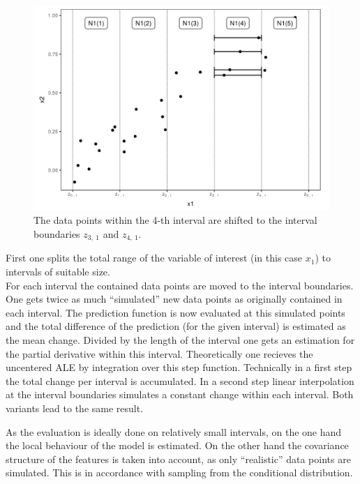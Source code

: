 \documentclass[
]{krantz}
\begin{document}
\begin{figure}
\includegraphics[width=1\linewidth]{images/ale_estimation_intuition} \caption{The data points within the 4-th interval are shifted to the interval boundaries \(z_{3,~1}\) and \(z_{4,~1}\).}\label{fig:dataALE}
\end{figure}



First one splits the total range of the variable of interest (in this case \(x_1\)) to intervals of suitable size.\\
For each interval the contained data points are moved to the interval boundaries. One gets twice as much ``simulated'' new data points as originally contained in each interval. The prediction function is now evaluated at this simulated points and the total difference of the prediction (for the given interval) is estimated as the mean change. Divided by the length of the interval one gets an estimation for the partial derivative within this interval. Theoretically one recieves the uncentered ALE by integration over this step function. Technically in a first step the total change per interval is accumulated. In a second step linear interpolation at the interval boundaries simulates a constant change within each interval. Both variants lead to the same result.

As the evaluation is ideally done on relatively small intervals, on the one hand the local behaviour of the model is estimated. On the other hand the covariance structure of the features is taken into account, as only ``realistic'' data points are simulated. This is in accordance with sampling from the conditional distribution.
\end{document}
